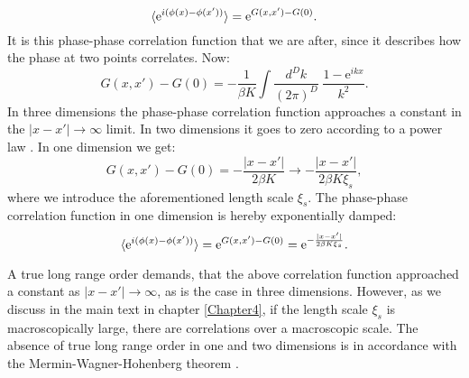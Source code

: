 \begin{equation}
\braket{ \text{e}^{i(\phi(x)- \phi(x'))} } = \text{e}^{G(x,x') - G(0)}. 
\label{eq.phasecorrelationfunction.generaldimension} 
\end{equation}
It is this phase-phase correlation function that we are after, since it describes how the phase at two points correlates. Now:
\begin{equation}
G(x,x') - G(0) = -\frac{1}{\beta K}\int \frac{d^{D}k}{(2\pi)^D}\; \frac{1 - \text{e}^{ikx}}{k^2}. \nonumber
\end{equation}
In three dimensions the phase-phase correlation function approaches a constant in the $|x - x'| \to \infty$ limit. In two dimensions it goes to zero according to a power law \cite[p. 115]{Cardy.StatPhys}. In one dimension we get: 
\begin{equation}
G(x,x') - G(0) = -\frac{|x - x'|}{2\beta K}  \to -\frac{|x - x'|}{2\beta K \xi_s},  
\end{equation}
where we introduce the aforementioned length scale $\xi_s$. The phase-phase correlation function in one dimension is hereby exponentially damped:
\begin{equation}
\braket{ \text{e}^{i(\phi(x)- \phi(x'))} } = \text{e}^{G(x,x') - G(0)} = \text{e}^{-\frac{|x - x'|}{2\beta K \xi_s}}. 
\label{eq.phasecorrelationfunction.onedimension} 
\end{equation}

A true long range order demands, that the above correlation function approached a constant as $|x - x'| \to \infty$, as is the case in three dimensions. However, as we discuss in the main text in chapter \ref{Chapter4}, if the length scale $\xi_s$ is macroscopically large, there are correlations over a macroscopic scale. The absence of true long range order in one and two dimensions is in accordance with the Mermin-Wagner-Hohenberg theorem \cite{Hohenberg.MerminWagnertheorem}. 

